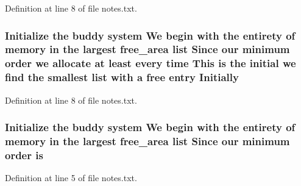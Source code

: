 Definition at line 8 of file notes.\+txt.

\subsubsection[{\texorpdfstring{Initially}{Initially}}]{\setlength{\rightskip}{0pt plus 5cm}Initialize the buddy system We begin with the entirety of memory {\bf in} the largest {\bf free\+\_\+area} {\bf list} Since our minimum {\bf order} we allocate at least every time This {\bf is} the initial we find the smallest {\bf list} with a free entry Initially}\hypertarget{notes_8txt_af94996a6cb9ce95900afa88455dbe21f}{}\label{notes_8txt_af94996a6cb9ce95900afa88455dbe21f}


Definition at line 8 of file notes.\+txt.

\subsubsection[{\texorpdfstring{is}{is}}]{\setlength{\rightskip}{0pt plus 5cm}Initialize the buddy system We begin with the entirety of memory {\bf in} the largest {\bf free\+\_\+area} {\bf list} Since our minimum {\bf order} is}\hypertarget{notes_8txt_afdcba1605c13ab6a6a89a58079be00f2}{}\label{notes_8txt_afdcba1605c13ab6a6a89a58079be00f2}


Definition at line 5 of file notes.\+txt.

